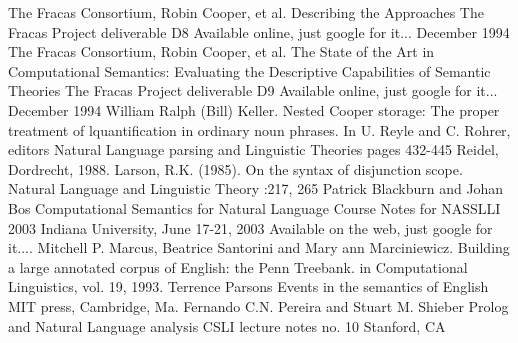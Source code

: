 \documentclass{book}[9pt]
\begin{document}
\begin{thebibliography}{1}
\newblock The Fracas Consortium, Robin Cooper, et al.
\newblock Describing the Approaches
\newblock The Fracas Project deliverable D8
\newblock Available online, just google for it...
\newblock December 1994
\newblock The Fracas Consortium, Robin Cooper, et al.
\newblock The State of the Art in Computational Semantics:
\newblock Evaluating the Descriptive Capabilities of Semantic Theories
\newblock The Fracas Project deliverable D9
\newblock Available online, just google for it...
\newblock December 1994
\newblock William Ralph (Bill) Keller.
\newblock Nested Cooper storage: The proper treatment of
lquantification in ordinary noun phrases.
\newblock In U. Reyle and C. Rohrer, editors
\newblock Natural Language parsing and Linguistic Theories
\newblock pages 432-445
\newblock Reidel, Dordrecht, 1988.
\newblock Larson, R.K. (1985).  On the syntax of disjunction scope.
\newblock Natural Language and Linguistic Theory
:217, 265
\newblock Patrick Blackburn and Johan Bos
\newblock Computational Semantics for Natural Language
\newblock Course Notes for NASSLLI 2003
\newblock Indiana University, June 17-21, 2003
\newblock Available on the web, just google for it....
\newblock Mitchell P. Marcus,  Beatrice Santorini and Mary ann Marciniewicz.
\newblock Building a large annotated corpus of English: the Penn Treebank.
\newblock in Computational Linguistics, vol. 19, 1993.
\newblock Terrence Parsons
\newblock Events in the semantics of English
\newblock MIT press, Cambridge, Ma.
\newblock Fernando C.N. Pereira and Stuart M. Shieber
\newblock Prolog and Natural Language analysis
\newblock CSLI lecture notes no. 10
\newblock Stanford, CA
\end{thebibliography}
\end{document}
